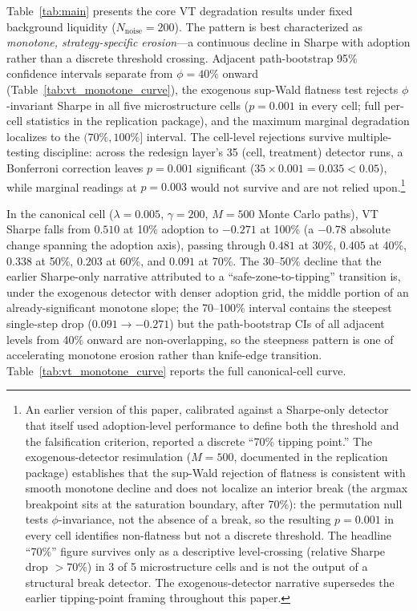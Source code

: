 \documentclass[12pt,a4paper]{article}
\begin{document}
Table~\ref{tab:main} presents the core VT degradation results under fixed background liquidity ($N_{\text{noise}} = 200$). The pattern is best characterized as \emph{monotone, strategy-specific erosion}---a continuous decline in Sharpe with adoption rather than a discrete threshold crossing. Adjacent path-bootstrap 95\% confidence intervals separate from $\phi = 40\%$ onward (Table~\ref{tab:vt_monotone_curve}), the exogenous sup-Wald flatness test rejects $\phi$-invariant Sharpe in all five microstructure cells ($p = 0.001$ in every cell; full per-cell statistics in the replication package), and the maximum marginal degradation localizes to the $(70\%, 100\%]$ interval. The cell-level rejections survive multiple-testing discipline: across the redesign layer's 35 (cell, treatment) detector runs, a Bonferroni correction leaves $p = 0.001$ significant ($35 \times 0.001 = 0.035 < 0.05$), while marginal readings at $p = 0.003$ would not survive and are not relied upon.\footnote{An earlier version of this paper, calibrated against a Sharpe-only detector that itself used adoption-level performance to define both the threshold and the falsification criterion, reported a discrete ``70\% tipping point.'' The exogenous-detector resimulation ($M = 500$, documented in the replication package) establishes that the sup-Wald rejection of flatness is consistent with smooth monotone decline and does not localize an interior break (the argmax breakpoint sits at the saturation boundary, after 70\%): the permutation null tests $\phi$-invariance, not the absence of a break, so the resulting $p = 0.001$ in every cell identifies non-flatness but not a discrete threshold. The headline ``70\%'' figure survives only as a descriptive level-crossing (relative Sharpe drop $>70\%$) in 3 of 5 microstructure cells and is not the output of a structural break detector. The exogenous-detector narrative supersedes the earlier tipping-point framing throughout this paper.}

In the canonical cell ($\lambda = 0.005$, $\gamma = 200$, $M = 500$ Monte Carlo paths), VT Sharpe falls from $0.510$ at 10\% adoption to $-0.271$ at 100\% (a $-0.78$ absolute change spanning the adoption axis), passing through $0.481$ at 30\%, $0.405$ at 40\%, $0.338$ at 50\%, $0.203$ at 60\%, and $0.091$ at 70\%. The 30--50\% decline that the earlier Sharpe-only narrative attributed to a ``safe-zone-to-tipping'' transition is, under the exogenous detector with denser adoption grid, the middle portion of an already-significant monotone slope; the 70--100\% interval contains the steepest single-step drop ($0.091 \to -0.271$) but the path-bootstrap CIs of all adjacent levels from 40\% onward are non-overlapping, so the steepness pattern is one of accelerating monotone erosion rather than knife-edge transition. Table~\ref{tab:vt_monotone_curve} reports the full canonical-cell curve.
\end{document}
